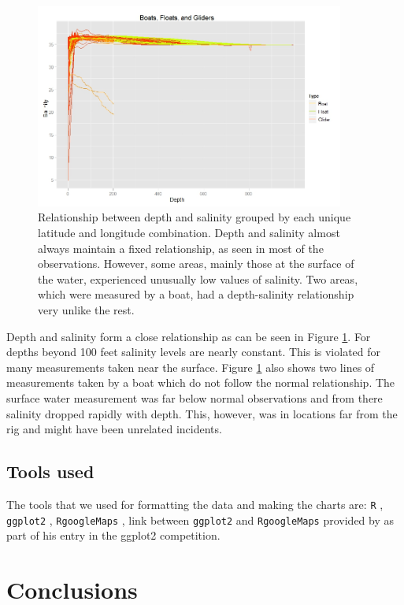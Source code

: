 \documentclass[authoryear,12pt]{elsarticle}
\begin{document}
\begin{figure}[htbp] %
   \centering
   \includegraphics[width=4in]{salinity-depth.jpeg} 
   \caption{Relationship between depth and salinity grouped by each unique latitude and longitude combination. Depth and salinity almost always maintain a fixed relationship, as seen in most of the observations. However, some areas, mainly those at the surface of the water, experienced unusually low values of salinity. Two areas, which were measured by a boat, had a depth-salinity relationship very unlike the rest.}
   \label{Depth-Salinity}
\end{figure}
Depth and salinity form a close relationship as can be seen in Figure \ref {Depth-Salinity}. For depths beyond 100 feet salinity levels are nearly constant. This is violated for  many measurements taken near the surface. Figure \ref {Depth-Salinity}  also shows  two lines of measurements taken by a boat which do not follow the normal relationship. The surface water measurement was far below normal observations and from there salinity dropped rapidly with depth. This, however, was in locations far from the rig and might have been unrelated incidents.

\subsection{Tools used}
The tools that we used for formatting the data and making the charts are:
{\tt R} \citep{R2011}, {\tt ggplot2} \citep{ggplot2}, {\tt RgoogleMaps} \citep{RgoogleMaps}, link between {\tt ggplot2} and {\tt RgoogleMaps} provided by \citet{kahle2010} as part of his entry in the ggplot2 competition.



\section{Conclusions}
\end{document}
